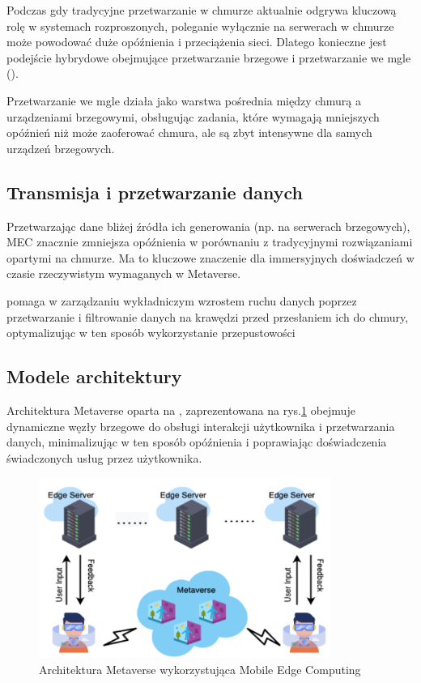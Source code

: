 Podczas gdy tradycyjne przetwarzanie w chmurze aktualnie odgrywa kluczową rolę w systemach rozproszonych, poleganie wyłącznie na serwerach w chmurze może powodować duże opóźnienia i przeciążenia sieci. Dlatego konieczne jest podejście hybrydowe obejmujące przetwarzanie brzegowe i przetwarzanie we mgle ().

Przetwarzanie we mgle działa jako warstwa pośrednia między chmurą a urządzeniami brzegowymi, obsługując zadania, które wymagają mniejszych opóźnień niż może zaoferować chmura, ale są zbyt intensywne dla samych urządzeń brzegowych.

\subsection{Transmisja i przetwarzanie danych}

Przetwarzając dane bliżej źródła ich generowania (np. na serwerach brzegowych), MEC znacznie zmniejsza opóźnienia w porównaniu z tradycyjnymi rozwiązaniami opartymi na chmurze. Ma to kluczowe znaczenie dla immersyjnych doświadczeń w czasie rzeczywistym wymaganych w Metaverse.

 pomaga w zarządzaniu wykładniczym wzrostem ruchu danych poprzez przetwarzanie i filtrowanie danych na krawędzi przed przesłaniem ich do chmury, optymalizując w ten sposób wykorzystanie przepustowości

\subsection{Modele architektury}

Architektura Metaverse oparta na , zaprezentowana na rys.\ref{mecBaseArch} obejmuje dynamiczne węzły brzegowe do obsługi interakcji użytkownika i przetwarzania danych, minimalizując w ten sposób opóźnienia i poprawiając doświadczenia świadczonych usług przez użytkownika.

\begin{figure}[htbp!]
    \centering
    \includegraphics[width=0.85\textwidth]{images/existingArchitectres/mecBaseArch.png}
    \caption{Architektura Metaverse wykorzystująca Mobile Edge Computing}
    \label{mecBaseArch}
\end{figure}

